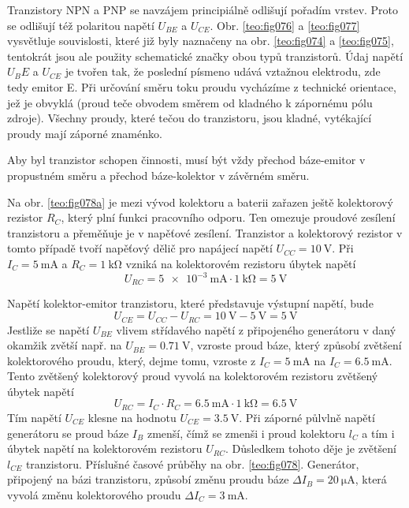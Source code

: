 {      Tranzistory NPN a PNP se navzájem principiálně odlišují pořadím vrstev. Proto se odlišují též
      polaritou napětí \(U_{BE}\) a \(U_{CE}\). Obr. \ref {teo:fig076} a \ref {teo:fig077}
      vysvětluje souvislosti, které již byly naznačeny na obr. \ref{teo:fig074} a \ref{teo:fig075},
      tentokrát jsou ale použity schematické značky obou typů tranzistorů. Údaj napětí \(U_BE\) a
      \(U_{CE}\) je tvořen tak, že poslední písmeno udává vztažnou elektrodu, zde tedy emitor E. Při
      určování směru toku proudu vycházíme z technické orientace, jež je obvyklá (proud teče obvodem
      směrem od kladného k zápornému pólu zdroje). Všechny proudy, které tečou do tranzistoru, jsou
      kladné, vytékající proudy mají záporné znaménko.

      Aby byl tranzistor schopen činnosti, musí být vždy přechod báze-emitor v propustném směru a
      přechod báze-kolektor v závěrném směru.

      Na obr. \ref{teo:fig078a} je mezi vývod kolektoru a baterii zařazen ještě kolektorový rezistor
      \(R_C\), který plní funkci pracovního odporu. Ten omezuje proudové zesílení tranzistoru a
      přeměňuje je v napěťové zesílení. Tranzistor a kolektorový rezistor v tomto případě tvoří
      napěťový dělič pro napájecí napětí \(U_{CC} = \SI{+10}{\V}\). Při \(I_C = \SI{5}{\mA}\) a
      \(R_C = \SI{1}{\kohm}\) vzniká na kolektorovém rezistoru úbytek napětí
      \begin{equation*}
        U_{RC} = \SI{5e-3}{\mA}\cdot\SI{1}{\kohm} = \SI{5}{\V}
      \end{equation*}


      Napětí kolektor-emitor tranzistoru, které představuje výstupní napětí, bude 
      \begin{equation*}
        U_{CE} = U_{CC} - U_{RC} = \SI{10}{\V} - \SI{5}{\V} = \SI{5}{\V}
      \end{equation*}
      Jestliže se napětí \(U_{BE}\) vlivem střídavého napětí z připojeného generátoru v daný okamžik
      zvětší např. na \(U_{BE} = \SI{0.71}{\V}\), vzroste proud báze, který způsobí zvětšení
      kolektorového proudu, který, dejme tomu, vzroste z \(I_C = \SI{5}{\mA}\) na \(I_C =
      \SI{6.5}{\mA}\). Tento zvětšený kolektorový proud vyvolá na kolektorovém rezistoru zvětšený
      úbytek napětí
      \begin{equation*}
        U_{RC} = I_C\cdot R_C = \SI{6.5}{\mA}\cdot\SI{1}{\kohm} = \SI{6.5}{\V}
      \end{equation*}
      Tím napětí \(U_{CE}\) klesne na hodnotu \(U_{CE} = \SI{3.5}{\V}\). Při záporné půlvlně napětí
      generátoru se proud báze \(I_B\) zmenší, čímž se zmenši i proud kolektoru \(l_C\) a tím i
      úbytek napětí na kolektorovém rezistoru \(U_{RC}\). Důsledkem tohoto děje je zvětšení
      \(l_{CE}\) tranzistoru. Příslušné časové průběhy na obr. \ref{teo:fig078}. Generátor,
      připojený na bázi tranzistoru, způsobí změnu proudu báze \(\Delta I_B = \SI{20}{\micro\A}\),
      která vyvolá změnu kolektorového proudu \(\Delta I_C = \SI{3}{\mA}\).

}
